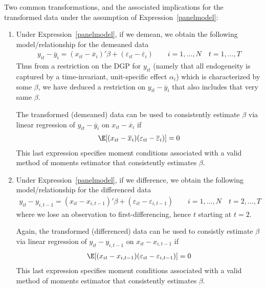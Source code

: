 \documentclass[12pt]{article}
\theoremstyle{plain}
\theoremstyle{definition}
\theoremstyle{remark}
\begin{document}
Two common transformations, and the associated implications for the
transformed data under the assumption of Expression~\ref{panelmodel}:
\begin{enumerate}
  \item
    Under Expression~\ref{panelmodel}, if we demean, we obtain the
    following model/relationship for the demeaned data
    \begin{align*}
      y_{it} - \overline{y}_i
      =
      (x_{it}-\overline{x}_i)'\beta
      + (\varepsilon_{it}-\overline{\varepsilon}_i)
      \qquad
      i = 1,\ldots,N
      \quad
      t = 1,\ldots,T
    \end{align*}
    Thus from a restriction on the DGP for $y_{it}$ (namely that all
    endogeneity is captured by a time-invariant, unit-specific effect
    $\alpha_i$) which is characterized by some $\beta$, we have deduced
    a restriction on $y_{it}-\overline{y}_i$ that also includes that
    very same $\beta$.

    The transformed (demeaned) data can be used to consistently estimate
    $\beta$ via linear regression of
    $y_{it}-\overline{y}_i$ on
    $x_{it}-\overline{x}_i$
    if
    \begin{align}
      \E[(x_{it}-\overline{x}_i)(\varepsilon_{it}-\overline{\varepsilon}_i)]=0
      \label{consistencycond_demean}
    \end{align}
    This last expression specifies moment conditions associated with a
    valid method of moments estimator that consistently estimates
    $\beta$.

  \item
    Under Expression~\ref{panelmodel}, if we difference, we obtain the
    following model/relationship for the differenced data
    \begin{align*}
      y_{it}-y_{i,t-1}
      =
      (x_{it}-x_{i,t-1})'\beta
      + (\varepsilon_{it}-\varepsilon_{i,t-1})
      \qquad
      i = 1,\ldots,N
      \quad
      t = 2,\ldots,T
    \end{align*}
    where we lose an observation to first-differencing, hence $t$
    starting at $t=2$.

    Again, the transformed (differenced) data can be used to consistly
    estimate $\beta$ via linear regression of
    $y_{it}-{y}_{i,t-1}$ on
    $x_{it}-{x}_{i,t-1}$
    if
    \begin{align}
      \E[(x_{it}-{x}_{i,t-1})(\varepsilon_{it}-{\varepsilon}_{i,t-1})]=0
      \label{consistencycond_diff}
    \end{align}
    This last expression specifies moment conditions associated with a
    valid method of moments estimator that consistently estimates
    $\beta$.
\end{enumerate}
\end{document}

